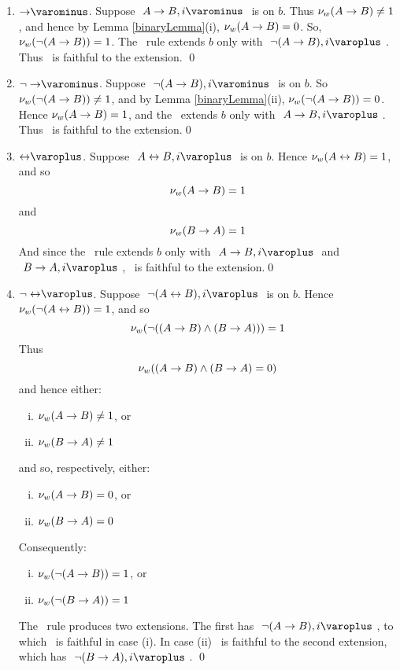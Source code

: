 \begin{proof*}
\begin{enumerate}
		\item $\uRule{ \arrow }$. 	Suppose $ \like{ \uNode{ A \arrow B }{ i } } $ is on $ b $.
							Thus $ \mathcal{\nu}_{ w }({ A \rightarrow B }) \neq 1 $, 
							and hence by Lemma \ref{binaryLemma}(i), $ \mathcal{\nu}_{ w }({ A \rightarrow B }) = 0 $.
							So, $ \mathcal{\nu}_{ w }({ \neg (A \rightarrow B ) }) = 1 $. 
							The \uRule{ \arrow }\ rule extends $b$ only with $ \like{ \dNodei{ \neg (A \arrow B )}} $.
							Thus \Model\ is faithful to the extension.
							\qed

		\item $\uRule{ \neg\arrow }$. Suppose $ \like{ \uNode{ \neg (A \arrow B) }{ i } } $ is on $ b $.
								So $ \mathcal{\nu}_{ w }({ \neg (A \rightarrow B ) }) \neq 1 $, and by Lemma \ref{binaryLemma}(ii),
								$ \mathcal{\nu}_{ w }({ \neg (A \rightarrow B ) }) = 0 $.
								Hence $ \mathcal{\nu}_{ w }({ A \rightarrow B }) = 1 $, and the \uRule{ \neg \arrow }\ extends $b$ only with
								$ \like{ \dNodei{ A \arrow B } } $.
								Thus \Model\ is faithful to the extension.\qed

		\item $\dRule{ \biarrow }$. 	Suppose $ \like{ \dNode{ A \biarrow B }{ i } } $ is on $ b $.
								Hence $ \mathcal{\nu}_{ w }({ A \leftrightarrow B }) = 1 $, and so
								\[ \mathcal{\nu}_{ w }({ A \rightarrow B }) = 1 \]
								and
								\[ \mathcal{\nu}_{ w }({ B \rightarrow A }) = 1 \]
								And since the \dRule{ \biarrow }\ rule extends $b$ only with
								$ \like{\dNodei{ A \arrow B }} $ and $ \like{ \dNodei{ B \arrow A }} $,
								\Model\ is faithful to the extension.\qed

		\item $\dRule{ \neg\biarrow }$. Suppose $ \like{ \dNode{ \neg (A \biarrow B) }{ i } } $ is on $ b $.
								Hence $ \mathcal{\nu}_{ w }({ \neg (A \leftrightarrow B )}) = 1 $, and so
								\[ \mathcal{\nu}_{ w }({ \neg ((A \rightarrow B) \wedge (B \rightarrow A)) }) = 1 \]
								Thus
								\[ \mathcal{\nu}_{ w }({ (A \rightarrow B) \wedge (B \rightarrow A ) = 0 }) \]
								and hence either:
								\begin{enumerate}[(i)]
									\item $ \mathcal{\nu}_{ w }({ A \rightarrow B }) \neq 1 $, or
									\item $ \mathcal{\nu}_{ w }({ B \rightarrow A }) \neq 1 $
								\end{enumerate}
								and so, respectively, either:
								\begin{enumerate}[(i)]
									\item $ \mathcal{\nu}_{ w }({ A \rightarrow B }) = 0 $, or
									\item $ \mathcal{\nu}_{ w }({ B \rightarrow A }) = 0 $
								\end{enumerate}
								Consequently:
								\begin{enumerate}[(i)]
									\item $ \mathcal{\nu}_{ w }({ \neg (A \rightarrow B )}) = 1 $, or
									\item $ \mathcal{\nu}_{ w }({ \neg (B \rightarrow A )}) = 1 $
								\end{enumerate}
								The \dRule{ \neg \biarrow }\ rule produces two extensions.
								The first has $ \like{ \dNodei{\neg (A \arrow B)}} $, to which \Model\ is faithful in case (i).
								In case (ii) \Model\ is faithful to the second extension, which has $ \like{ \dNodei{ \neg(B \arrow A )}} $.
								\qed
								

\end{enumerate}
\end{proof*}
